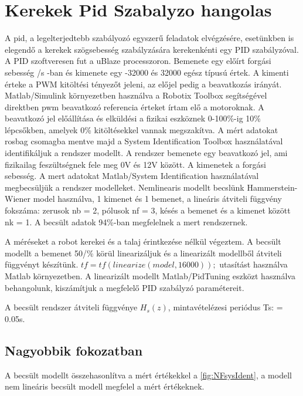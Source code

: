 \section{Kerekek Pid Szabalyzo hangolas}

A pid, a legelterjedtebb szabályozó egyszerű feladatok elvégzésére, esetünkben is elegendő a kerekek szögsebesség szabályzására kerekenkénti egy PID szabályzóval. A PID szoftveresen fut a uBlaze processzoron. Bemenete egy előírt forgási sebesség \degree/s -ban és kimenete egy -32000 és 32000 egész típusú értek. A kimenti érteke a PWM kitöltési tényezőt jeleni, az előjel pedig a beavatkozás irányát.
Matlab/Simulink környezetben használva a Robotix Toolbox segítségével direktben pwm beavatkozó referencia érteket írtam elő a motoroknak. A beavatkozó jel előállítása és elküldési a fizikai eszköznek 0-100\%-ig 10\% lépcsőkben, amelyek 0\% kitöltésekkel vannak megszakítva. A mért adatokat rosbag csomagba mentve majd a System Identification Toolbox használatával identifikáljuk a rendszer modellt. A rendszer bemenete egy beavatkozó jel, ami fizikailag feszültségnek fele meg 0V és 12V között. A kimenetek a forgási sebesség.
A mert adatokat Matlab/System Identification használatával megbecsüljük a rendszer modelleket. Nemlinearis modellt becslünk 
Hammerstein-Wiener model \cite{matlabhwmmodel} használva, 1 kimenet és 1 bemenet, a lineáris átviteli függvény fokszáma:
zerusok nb = 2, pólusok nf = 3, késés a bemenet és a kimenet között nk = 1. A becsült adatok 94\%-ban megfelelnek a mert rendszernek.          

A méréseket a robot kerekei és a talaj érintkezése nélkül végeztem.
A becsült modellt a bemenet 50/\%  körül linearizáljuk és a linearizált modellből átviteli függvényt készítünk. 
$tf = tf(linearize(model,16000));$ utasítást használva Matlab környezetben. A linearizált modellt Matlab/PidTuning eszközt használva behangolunk, kiszámítjuk a megfelelő PID szabályzó paramétereit.



A becsült rendszer átviteli függvénye $H_s(z)$, mintavételézesi periódus Ts: = 0.05s.

\subsection*{Nagyobbik fokozatban}

A becsült modellt összehasonlítva a mért értékekkel a \ref{fig:NFsysIdent}, a modell nem lineáris becsült modell megfelel a mért értékeknek.

